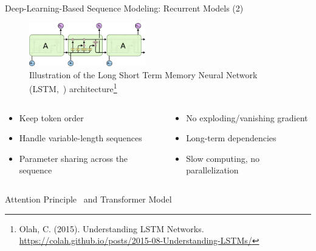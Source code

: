 \documentclass[11pt,aspectratio=169]{beamer}
\begin{document}
\begin{frame}{Deep-Learning-Based Sequence Modeling: Recurrent Models (2)}
    \begin{figure}
        \centering
        \includegraphics[width=0.45\textwidth]{LSTM3-chain.png}
        \caption{\centering Illustration of the Long Short Term Memory Neural Network (LSTM,~\cite{lstm}) architecture\footnote{\tiny Olah, C. (2015). Understanding LSTM Networks. \url{https://colah.github.io/posts/2015-08-Understanding-LSTMs/}}}
    \end{figure}
    \begin{columns}
        \begin{column}{0.5\linewidth}
            \begin{itemize}
                \item {\color{darkgreen}\checkmark} Keep token order
                \item {\color{darkgreen}\checkmark} Handle variable-length sequences
                \item {\color{darkgreen}\checkmark} Parameter sharing across the sequence
            \end{itemize}
        \end{column}
        \begin{column}{0.5\linewidth}
            \begin{itemize}
                \item {\color{darkgreen}\checkmark} No exploding/vanishing gradient
                \item {\color{darkgreen}\checkmark} Long-term dependencies
                \item {\color{red}} Slow computing, no parallelization
            \end{itemize}
        \end{column}
    \end{columns}
\end{frame}

\begin{frame}{Attention Principle~\cite{Bahdanau2014NeuralMT} and Transformer Model~\cite{DBLP:journals/corr/VaswaniSPUJGKP17}}
    
\end{frame}
\end{document}
